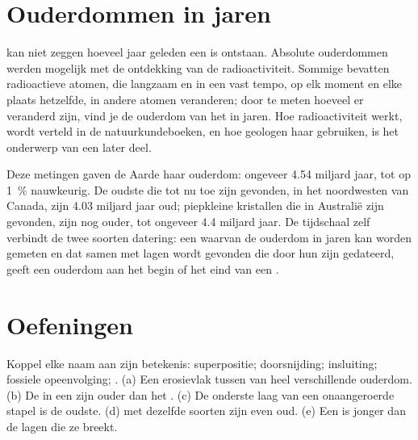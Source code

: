 \section{Ouderdommen in jaren}

 kan niet zeggen hoeveel jaar geleden een  is
ontstaan. Absolute ouderdommen werden mogelijk met de ontdekking van de
radioactiviteit. Sommige  bevatten radioactieve atomen, die
langzaam en in een vast tempo, op elk moment en elke plaats hetzelfde, in
andere atomen veranderen; door te meten hoeveel er veranderd zijn, vind je
de ouderdom van het  in jaren. Hoe radioactiviteit werkt, wordt
verteld in de natuurkundeboeken, en hoe geologen haar gebruiken, is het
onderwerp van een later deel.

Deze metingen gaven de Aarde haar ouderdom: ongeveer \num{4.54} miljard
jaar, tot op 1~\% nauwkeurig. De oudste  die tot nu toe zijn
gevonden, in het noordwesten van Canada, zijn \num{4.03} miljard jaar oud;
piepkleine kristallen die in Australië zijn gevonden, zijn nog ouder, tot
ongeveer \num{4.4} miljard jaar. De tijdschaal zelf verbindt de twee soorten
datering: een  waarvan de ouderdom in jaren kan worden gemeten en
dat samen met lagen wordt gevonden die door hun  zijn gedateerd,
geeft een ouderdom aan het begin of het eind van een .

\section{Oefeningen}

\begin{exercise}[$\star$]\label{exo:g7:geological-time:1}
Koppel elke naam aan zijn betekenis: superpositie; doorsnijding;
insluiting; fossiele opeenvolging; . (a) Een erosievlak tussen
 van heel verschillende ouderdom. (b) De  in een
 zijn ouder dan het . (c) De onderste laag van een
onaangeroerde stapel is de oudste. (d)  met dezelfde soorten
 zijn even oud. (e) Een  is jonger dan de lagen die ze breekt.
\end{exercise}

